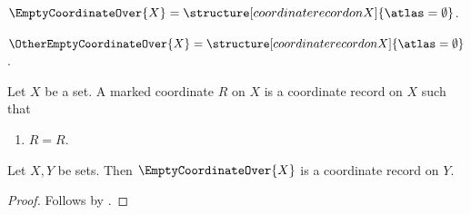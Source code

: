 

\begin{definition}\label{empty_coordinate_over}
    $\EmptyCoordinateOver{X}=\structure[coordinate record on X]{\atlas=\emptyset}$.
\end{definition}

\begin{definition}\label{other_empty_coordinate_over}
    $\OtherEmptyCoordinateOver{X}=\structure[coordinate record on X]{\atlas=\emptyset}$.
\end{definition}

\begin{struct}\label{marked_coordinate}
    Let $X$ be a set.
    A marked coordinate $R$ on $X$ is a coordinate record on $X$ such that
    \begin{enumerate}
        \item\label{marked_coordinate_reflexive} $R=R$.
    \end{enumerate}
\end{struct}

\begin{classification}\label{empty_coordinate_any_parameter}
    Let $X,Y$ be sets.
    Then $\EmptyCoordinateOver{X}$ is a coordinate record on $Y$.
\end{classification}
\begin{proof}
    Follows by .
\end{proof}

